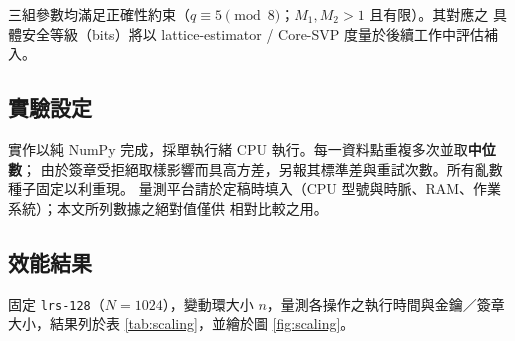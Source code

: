 \begin{table}[ht]
  \centering
  \caption{各參數集與拒絕取樣常數。$\mathrm{E}[\text{attempts}]=M_1M_2$ 為每次簽章
           之期望重試次數。安全等級欄留待後續以 lattice-estimator 評估。}
  \label{tab:params}
  \small
\end{table}

三組參數均滿足正確性約束（$q\equiv 5\pmod 8$；$M_1,M_2>1$ 且有限）。其對應之
具體安全等級（bits）將以 lattice-estimator / Core-SVP 度量於後續工作中評估補入。

\subsection{實驗設定}
\label{subsec:impl-setup}

實作以純 NumPy 完成，採單執行緒 CPU 執行。每一資料點重複多次並取\textbf{中位數}；
由於簽章受拒絕取樣影響而具高方差，另報其標準差與重試次數。所有亂數種子固定以利重現。
量測平台請於定稿時填入（CPU 型號與時脈、RAM、作業系統）；本文所列數據之絕對值僅供
相對比較之用。

\subsection{效能結果}
\label{subsec:impl-results}

固定 \texttt{lrs-128}（$N=1024$），變動環大小 $n$，量測各操作之執行時間與金鑰／簽章
大小，結果列於表 \ref{tab:scaling}，並繪於圖 \ref{fig:scaling}。

